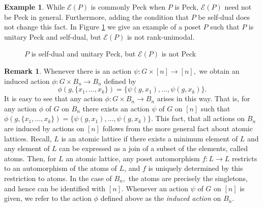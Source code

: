 \documentclass[10 pt]{amsart}
\theoremstyle{plain}
\theoremstyle{definition}
\newtheorem{rem}[thm]{Remark}
\newtheorem{eg}[thm]{Example}
\theoremstyle{remark}
\numberwithin{equation}{section}
\begin{document}
\begin{eg}
While $\mathcal{E}(P)$ is commonly Peck when $P$ is Peck, $\mathcal E(P)$ need not be Peck in general.  Furthermore, adding the condition that $P$ be self-dual does not change this fact.  In Figure \ref{fig:dual_not_unimodal} we give an example of a poset $P$ such that $P$ is unitary Peck and self-dual, but $\mathcal{E}(P)$ is not rank-unimodal.
\end{eg}

\begin{figure}[h]
\label{fig:dual_not_unimodal}

\qquad
{}
\caption{$P$ is self-dual and unitary Peck, but $\mathcal{E}(P)$ is not Peck}
\end{figure}


\begin{rem}
\label{rem:induced_action_bn}
Whenever there is an action $\psi:G \times [n] \rightarrow [n],$ we obtain an induced action $\phi: G \times B_n \rightarrow B_n$ defined by
$$\phi(g,\{x_1,\ldots, x_k\}) = \{\psi(g,x_1),\ldots, \psi(g,x_k)\}.$$
It is easy to see that any action $\phi:G \times B_n \rightarrow B_n$ arises in this way. That is, for any action $\phi$ of $G$ on $B_n$ there exists an action $\psi$ of $G$ on $[n]$ such that $\phi(g,\{x_1,\ldots, x_k\}) = \{\psi(g,x_1),\ldots, \psi(g,x_k)\}.$ This fact, that all actions on $B_n$ are induced by actions on $[n]$ follows from the more general fact about atomic lattices. Recall, $L$ is an atomic lattice if there exists a minimum element of $L$ and any element of $L$ can be expressed as a join of a subset of the elements, called atoms. Then, for $L$ an atomic lattice, any poset automorphism $f:L \rightarrow L$ restricts to an automorphism of the atoms of $L$, and $f$ is uniquely determined by this restriction to atoms. In the case of $B_n,$ the atoms are precisely the singletons, and hence can be identified with $[n]$.  Whenever an action $\psi$ of $G$ on $[n]$ is given, we refer to the action $\phi$ defined above as the {\it induced action} on $B_n.$
\end{rem}
\end{document}
